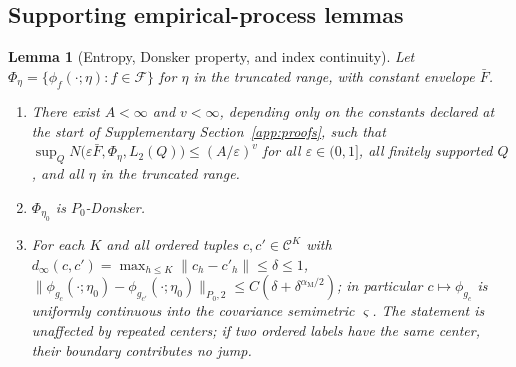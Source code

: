\documentclass[11pt]{article}
\newtheorem{lemma}{Lemma}
\newcommand{\calC}{\mathcal C}
\newcommand{\calF}{\mathcal F}
\newcommand{\eps}{\varepsilon}
\newcommand{\norm}[1]{\lVert #1\rVert}
\newcommand{\am}{\alpha_{\mathrm M}}
\begin{document}
\subsection{Supporting empirical-process lemmas}\label{app:lemmas}

\begin{lemma}[Entropy, Donsker property, and index continuity]\label{lem:donsker}
Let $\Phi_\eta=\{\phi_f(\cdot;\eta):f\in\calF\}$ for $\eta$ in the truncated range, with constant envelope $\bar F$.
\begin{enumerate}[label=(\alph*),leftmargin=2em]
\item There exist $A<\infty$ and $v<\infty$, depending only on the constants declared at the start of Supplementary Section~\ref{app:proofs}, such that
$\sup_Q N\bigl(\eps\bar F,\Phi_\eta,L_2(Q)\bigr)\le(A/\eps)^v$ for all $\eps\in(0,1]$, all finitely supported $Q$, and all $\eta$ in the truncated range.
\item $\Phi_{\eta_0}$ is $P_0$-Donsker.
\item For each $K$ and all ordered tuples $c,c'\in\calC^K$ with $d_\infty(c,c')=\max_{h\le K}\norm{c_h-c'_h}\le\delta\le1$,
$\norm{\phi_{g_c}(\cdot;\eta_0)-\phi_{g_{c'}}(\cdot;\eta_0)}_{P_0,2}\le C(\delta+\delta^{\am/2})$;
in particular $c\mapsto\phi_{g_c}$ is uniformly continuous into the covariance semimetric $\varsigma$. The statement is unaffected by repeated centers; if two ordered labels have the same center, their boundary contributes no jump.
\end{enumerate}
\end{lemma}
\end{document}

